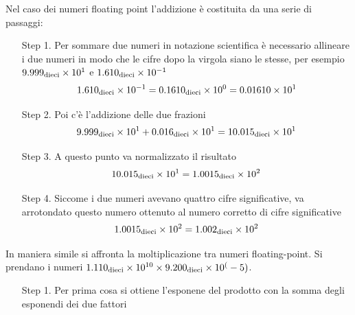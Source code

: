 \documentclass[a4paper,12pt]{article}
\theoremstyle{break}
\numberwithin{equation}{section}
\begin{document}
    Nel caso dei numeri floating point l'addizione è costituita da una serie di passaggi:
    \begin{itemize}
        \item[Step 1.] Per sommare due numeri in notazione scientifica è necessario allineare i due numeri in modo che le cifre dopo la virgola siano le stesse, per esempio \( 9.999_{\mbox{\scriptsize dieci}} \times 10^1\) e \(1.610_{\mbox{\scriptsize dieci}} \times 10^{-1}\) 
        \[
            1.610_{\mbox{\scriptsize dieci}} \times 10^{-1} = 0.1610_{\mbox{\scriptsize dieci}} \times 10^0 = 0.01610 \times 10^1
        \]
        \item[Step 2.] Poi c'è l'addizione delle due frazioni \[9.999_{\mbox{\scriptsize dieci}} \times 10^1 + 0.016_{\mbox{\scriptsize dieci}} \times 10^1 = 10.015_{\mbox{\scriptsize dieci}} \times 10^1\]
        \item[Step 3.] A questo punto va normalizzato il risultato \[10.015_{\mbox{\scriptsize dieci}} \times 10^1 = 1.0015_{\mbox{\scriptsize dieci}}\times 10^2\]  
        \item[Step 4.] Siccome i due numeri avevano quattro cifre significative, va arrotondato questo numero ottenuto al numero corretto di cifre significative
        \[
           1.0015_{\mbox{\scriptsize dieci}} \times 10^2 = 1.002_{\mbox{\scriptsize dieci}} \times 10^2 
        \] 
    \end{itemize}
In maniera simile si affronta la moltiplicazione tra numeri floating-point. Si prendano i numeri \(1.110_{\mbox{\scriptsize dieci}} \times 10^{10} \times 9.200_{\mbox{\scriptsize dieci}} \times 10^(-5)\).
\begin{itemize}
    \item[Step 1.] Per prima cosa si ottiene l'esponene del prodotto con la somma degli esponendi dei due fattori 
\end{itemize}
\end{document}

